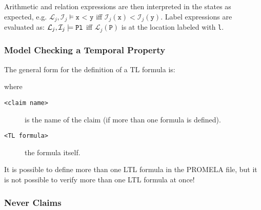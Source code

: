 					Arithmetic and relation expressions are then interpreted in the states as expected, e.g. \( \mathcal{L}_j, \mathcal{I}_j \models \texttt{x < y} \) iff \( \mathcal{I}_j(\texttt{x}) < \mathcal{I}_j(\texttt{y}) \). Label expressions are evaluated as: \( \mathcal{L}_j, \mathcal{I}_j \models \texttt{P\@l} \) iff \( \mathcal{L}_j(\texttt{P}) \) is at the location labeled with \texttt{l}.
			
			\subsubsection{Model Checking a Temporal Property}
				\label{sec:temporalProp}
			
				The general form for the definition of a TL formula is:
				\begin{center}
				\end{center}
				where
				\begin{description}
					\item[\texttt{<claim name>}] is the name of the claim (if more than one formula is defined).
					\item[\texttt{<TL formula>}] the formula itself.
				\end{description}
			
				It is possible to define more than one LTL formula in the PROMELA file, but it is not possible to verify more than one LTL formula at once!
			
			\subsubsection{Never Claims}
				\label{sec:neverclaim}
			
